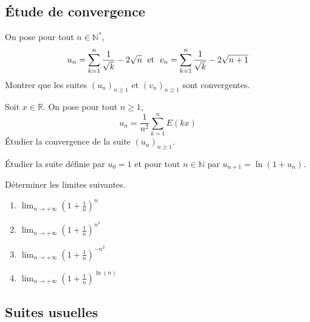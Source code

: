 \documentclass[a4paper,twoside,french,11pt]{VcCours}
\begin{document}


\subsection{Étude de convergence}


\begin{Exercice}
On pose pour tout $n \in \mathbb{N}^*$, 
    \[
    u_n = \sum_{k = 1}^n {\frac{1}{\sqrt k}} - 2\sqrt n \; \hbox{ et } \; v_n = \sum_{k = 1}^n {\frac{1}{\sqrt k}} - 2\sqrt {n + 1}
    \]
 Montrer que les suites $(u_n)_{n \geq 1}$ et $(v_n)_{n \geq 1}$ sont convergentes.
 \end{Exercice}
 
 
 
\begin{Exercice} Soit $x \in \mathbb{R}$. On pose pour tout $n \geq 1$, 
$$u_n = \frac{1}{n^2} \sum_{k=1}^n E(kx)$$
Étudier la convergence de la suite $(u_n)_{n \geq 1}$.
\end{Exercice}



\begin{Exercice} Étudier la suite définie par $u_0=1$ et pour tout $n \in \mathbb{N}$ par $u_{n+1}=\ln(1+u_n)$.
\end{Exercice} 


\begin{Exercice} Déterminer les limites suivantes. 

\begin{multicols}{2}
\begin{enumerate}
\item $\lim_{n \rightarrow + \infty} \left(1+ \frac{1}{n}\right)^n$
\item $\lim_{n \rightarrow + \infty} \left(1+ \frac{1}{n}\right)^{n^2}$
\columnbreak
\item $\lim_{n \rightarrow + \infty} \left(1+ \frac{1}{n}\right)^{-n^2}$
\item $\lim_{n \rightarrow + \infty} \left(1+ \frac{1}{n}\right)^{\ln(n)}$
\end{enumerate}
\end{multicols}
\vspace{0.1cm}
\end{Exercice} 



\subsection{Suites usuelles}
\end{document}
